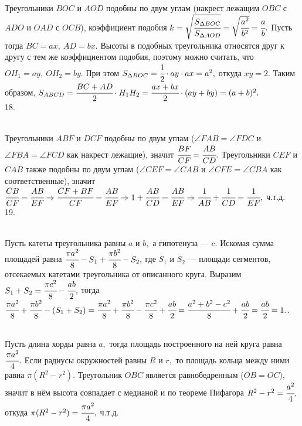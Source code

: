 Треугольники $BOC$ и $AOD$ подобны по двум углам (накрест лежащим $OBC$ с $ADO$ и $OAD$ с $OCB$), коэффициент подобия $k=\sqrt{\cfrac{S_{\Delta BOC}}{S_{\Delta AOD}}}=\sqrt{\cfrac{a^2}{b^2}}=\cfrac{a}{b}.$ Пусть тогда $BC=ax,\ AD=bx.$ Высоты в подобных треугольника относятся друг к другу с тем же коэффициентом подобия, поэтому можно считать, что $OH_1=ay,\ OH_2=by.$ При этом $S_{\Delta BOC}=\cfrac{1}{2}\cdot ay\cdot ax=a^2,$ откуда $xy=2.$ Таким образом, $S_{ABCD}=\cfrac{BC+AD}{2}\cdot H_1H_2=\cfrac{ax+bx}{2}\cdot(ay+by)=(a+b)^2.$\\
18. \begin{figure}[ht!]
\end{figure}\\
Треугольники $ABF$ и $DCF$ подобны по двум углам ($\angle FAB=\angle FDC$ и $\angle FBA=\angle FCD$ как накрест лежащие), значит $\cfrac{BF}{CF}=\cfrac{AB}{CD}.$ Треугольники $CEF$ и $CAB$ также подобны по двум углам ($\angle CEF=\angle CAB$ и $\angle CFE=\angle CBA$ как соответственные), значит $\cfrac{CB}{CF}=\cfrac{AB}{EF}\Rightarrow \cfrac{CF+BF}{CF}=\cfrac{AB}{EF}\Rightarrow 1+\cfrac{AB}{CD}=\cfrac{AB}{EF}
\Rightarrow \cfrac{1}{AB}+\cfrac{1}{CD}=\cfrac{1}{EF},$ ч.т.д.\\
19. \begin{figure}[ht!]
\end{figure}\\
Пусть катеты треугольника равны $a$ и $b,$ а гипотенуза --- $c.$ Искомая сумма площадей равна $\cfrac{\pi a^2}{8}-S_1+\cfrac{\pi b^2}{8}-S_2,$ где $S_1$ и $S_2$ --- площади сегментов, отсекаемых катетами треугольника от описанного круга. Выразим $S_1+S_2=\cfrac{\pi c^2}{8}-\cfrac{ab}{2},$ тогда
$\cfrac{\pi a^2}{8}+\cfrac{\pi b^2}{8}-(S_1+S_2)=\cfrac{\pi a^2}{8}+\cfrac{\pi b^2}{8}-\cfrac{\pi c^2}{8}+\cfrac{ab}{2}=\cfrac{a^2+b^2-c^2}{8}+\cfrac{ab}{2}=
\cfrac{ab}{2}=1.$\newpage{}. \begin{figure}[ht!]
\end{figure}\\
Пусть длина хорды равна $a,$ тогда площадь построенного на ней круга равна $\cfrac{\pi a^2}{4}.$ Если радиусы окружностей равны $R$ и $r,$ то площадь кольца между ними равна $\pi(R^2-r^2).$ Треугольник $OBC$ является равнобедренным ($OB=OC),$ значит в нём высота совпадает с медианой и по теореме Пифагора $R^2-r^2=\cfrac{a^2}{4},$ откуда $\pi(R^2-r^2)=\cfrac{\pi a^2}{4},$ ч.т.д.\\
